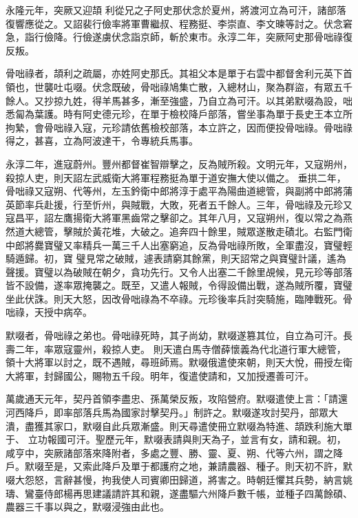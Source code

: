 \begin{pinyinscope}
 永隆元年，突厥又迎頡
 利從兄之子阿史那伏念於夏州，將渡河立為可汗，諸部落復響應從之。又詔裴行儉率將軍曹繼叔、程務挺、李崇直、李文暕等討之。伏念窘急，詣行儉降。行儉遂虜伏念詣京師，斬於東市。永淳二年，突厥阿史那骨咄祿復反叛。



 骨咄祿者，頡利之疏屬，亦姓阿史那氏。其祖父本是單于右雲中都督舍利元英下首領也，世襲吐屯啜。伏念既破，骨咄祿鳩集亡散，入總材山，聚為群盜，有眾五千
 餘人。又抄掠九姓，得羊馬甚多，漸至強盛，乃自立為可汗。以其弟默啜為設，咄悉匐為葉護。時有阿史德元珍，在單于檢校降戶部落，嘗坐事為單于長史王本立所拘縶，會骨咄祿入寇，元珍請依舊檢校部落，本立許之，因而便投骨咄祿。骨咄祿得之，甚喜，立為阿波達干，令專統兵馬事。



 永淳二年，進寇蔚州。豐州都督崔智辯擊之，反為賊所殺。文明元年，又寇朔州，殺掠人吏，則天詔左武威衛大將軍程務挺為單于道安撫大使以備之。
 垂拱二年，骨咄祿又寇朔、代等州，左玉鈐衛中郎將淳于處平為陽曲道總管，與副將中郎將蒲英節率兵赴援，行至忻州，與賊戰，大敗，死者五千餘人。三年，骨咄祿及元珍又寇昌平，詔左鷹揚衛大將軍黑齒常之擊卻之。其年八月，又寇朔州，復以常之為燕然道大總管，擊賊於黃花堆，大破之。追奔四十餘里，賊眾遂散走磧北。右監門衛中郎將爨寶璧又率精兵一萬三千人出塞窮追，反為骨咄祿所敗，全軍盡沒，寶璧輕騎遁歸。初，寶
 璧見常之破賊，遽表請窮其餘黨，則天詔常之與寶璧計議，遙為聲援。寶璧以為破賊在朝夕，貪功先行。又令人出塞二千餘里覘候，見元珍等部落皆不設備，遂率眾掩襲之。既至，又遣人報賊，令得設備出戰，遂為賊所覆，寶璧坐此伏誅。則天大怒，因改骨咄祿為不卒祿。元珍後率兵討突騎施，臨陣戰死。骨咄祿，天授中病卒。



 默啜者，骨咄祿之弟也。骨咄祿死時，其子尚幼，默啜遂篡其位，自立為可汗。長壽二年，率眾寇靈州，殺掠人吏。
 則天遣白馬寺僧薛懷義為代北道行軍大總管，領十大將軍以討之，既不遇賊，尋班師焉。默啜俄遣使來朝，則天大悅，冊授左衛大將軍，封歸國公，賜物五千段。明年，復遣使請和，又加授遷善可汗。



 萬歲通天元年，契丹首領李盡忠、孫萬榮反叛，攻陷營府。默啜遣使上言：「請還河西降戶，即率部落兵馬為國家討擊契丹。」制許之。默啜遂攻討契丹，部眾大潰，盡獲其家口，默啜自此兵眾漸盛。則天尋遣使冊立默啜為特進、頡跌利施大單于、
 立功報國可汗。聖歷元年，默啜表請與則天為子，並言有女，請和親。初，咸亨中，突厥諸部落來降附者，多處之豐、勝、靈、夏、朔、代等六州，謂之降戶。默啜至是，又索此降戶及單于都護府之地，兼請農器、種子。則天初不許，默啜大怨怒，言辭甚慢，拘我使人司賓卿田歸道，將害之。時朝廷懼其兵勢，納言姚璹、鸞臺侍郎楊再思建議請許其和親，遂盡驅六州降戶數千帳，並種子四萬餘碩、農器三千事以與之，默啜浸強由此也。




\end{pinyinscope}
